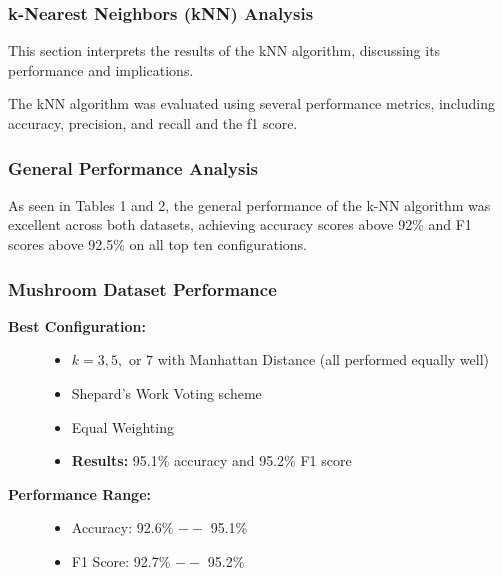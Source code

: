 \subsubsection{k-Nearest Neighbors (kNN) Analysis}
\label{subsubsec:discussion-knn}

This section interprets the results of the kNN algorithm, discussing its performance and implications.

The kNN algorithm was evaluated using several performance metrics, including accuracy, precision, and recall and the f1 score.

\subsubsection*{General Performance Analysis}
As seen in Tables 1 and 2, the general performance of the k-NN algorithm was excellent across both datasets,
achieving accuracy scores above 92\% and F1 scores above 92.5\% on all top ten configurations.

\subsubsection{Mushroom Dataset Performance}

\begin{description}
    \item[\textbf{Best Configuration:}]\leavevmode
        \begin{itemize}
            \item $k = 3, 5,$ or $7$ with Manhattan Distance (all performed equally well)
            \item Shepard's Work Voting scheme
            \item Equal Weighting
            \item \textbf{Results:} 95.1\% accuracy and 95.2\% F1 score
        \end{itemize}
    
    \item[\textbf{Performance Range:}]\leavevmode
        \begin{itemize}
            \item Accuracy: 92.6\% $--$ 95.1\%
            \item F1 Score: 92.7\% $--$ 95.2\%
        \end{itemize}
\end{description}

